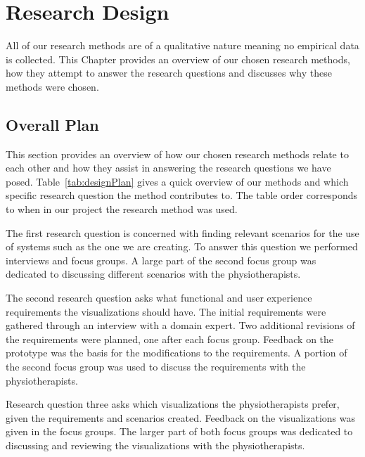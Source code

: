 \chapter{Research Design}
\label{ch:researchDesign}
All of our research methods are of a qualitative nature meaning no empirical data is collected. This Chapter provides an overview of our chosen research methods, how they attempt to answer the research questions and discusses why these methods were chosen.

\section{Overall Plan}
\label{sec:overview}
This section provides an overview of how our chosen research methods relate to each other and how they assist in answering the research questions we have posed. Table~\ref{tab:designPlan} gives a quick overview of our methods and which specific research question the method contributes to. The table order corresponds to when in our project the research method was used.

The first research question is concerned with finding relevant scenarios for the use of systems such as the one we are creating. To answer this question we performed interviews and focus groups. A large part of the second focus group was dedicated to discussing different scenarios with the physiotherapists.

The second research question asks what functional and user experience requirements the visualizations should have. The initial requirements were gathered through an interview with a domain expert. Two additional revisions of the requirements were planned, one after each focus group. Feedback on the prototype was the basis for the modifications to the requirements. A portion of the second focus group was used to discuss the requirements with the physiotherapists.

Research question three asks which visualizations the physiotherapists prefer, given the requirements and scenarios created. Feedback on the visualizations was given in the focus groups. The larger part of both focus groups was dedicated to discussing and reviewing the visualizations with the physiotherapists. 

